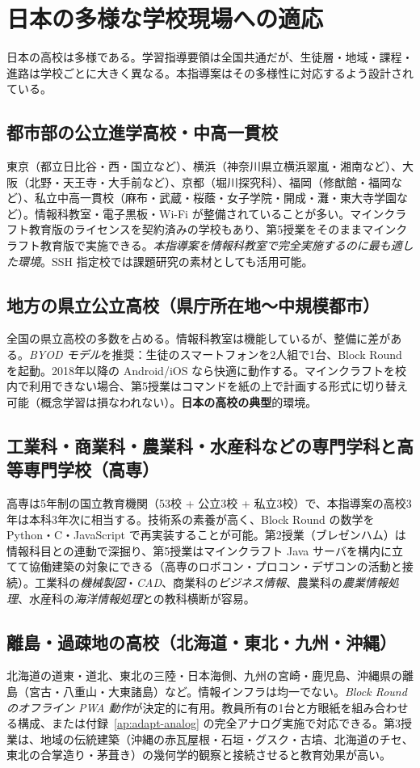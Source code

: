 \documentclass[12pt,a4paper]{scrartcl}
\newcommand{\acc}[1]{\textcolor{accent}{\textbf{#1}}}
\begin{document}
\section{日本の多様な学校現場への適応}\label{sec:adapt}

日本の高校は多様である。学習指導要領は全国共通だが、生徒層・地域・課程・進路は学校ごとに大きく異なる。本指導案はその多様性に対応するよう設計されている。

\subsection{都市部の公立進学高校・中高一貫校}
東京（都立日比谷・西・国立など）、横浜（神奈川県立横浜翠嵐・湘南など）、大阪（北野・天王寺・大手前など）、京都（堀川探究科）、福岡（修猷館・福岡など）、私立中高一貫校（麻布・武蔵・桜蔭・女子学院・開成・灘・東大寺学園など）。情報科教室・電子黒板・Wi-Fi が整備されていることが多い。マインクラフト教育版のライセンスを契約済みの学校もあり、第5授業をそのままマインクラフト教育版で実施できる。\emph{本指導案を情報科教室で完全実施するのに最も適した環境}。SSH 指定校では課題研究の素材としても活用可能。

\subsection{地方の県立公立高校（県庁所在地〜中規模都市）}
全国の県立高校の多数を占める。情報科教室は機能しているが、整備に差がある。\emph{BYOD モデル}を推奨：生徒のスマートフォンを2人組で1台、Block Round を起動。2018年以降の Android/iOS なら快適に動作する。マインクラフトを校内で利用できない場合、第5授業はコマンドを紙の上で計画する形式に切り替え可能（概念学習は損なわれない）。\acc{日本の高校の典型}的環境。

\subsection{工業科・商業科・農業科・水産科などの専門学科と高等専門学校（高専）}
高専は5年制の国立教育機関（53校 + 公立3校 + 私立3校）で、本指導案の高校3年は本科3年次に相当する。技術系の素養が高く、Block Round の数学を Python・C・JavaScript で再実装することが可能。第2授業（ブレゼンハム）は情報科目との連動で深掘り、第5授業はマインクラフト Java サーバを構内に立てて協働建築の対象にできる（高専のロボコン・プロコン・デザコンの活動と接続）。工業科の\emph{機械製図}・\emph{CAD}、商業科の\emph{ビジネス情報}、農業科の\emph{農業情報処理}、水産科の\emph{海洋情報処理}との教科横断が容易。

\subsection{離島・過疎地の高校（北海道・東北・九州・沖縄）}
北海道の道東・道北、東北の三陸・日本海側、九州の宮崎・鹿児島、沖縄県の離島（宮古・八重山・大東諸島）など。情報インフラは均一でない。\emph{Block Round のオフライン PWA 動作}が決定的に有用。教員所有の1台と方眼紙を組み合わせる構成、または付録~\ref{ap:adapt-analog} の完全アナログ実施で対応できる。第3授業は、地域の伝統建築（沖縄の赤瓦屋根・石垣・グスク・古墳、北海道のチセ、東北の合掌造り・茅葺き）の幾何学的観察と接続させると教育効果が高い。
\end{document}
